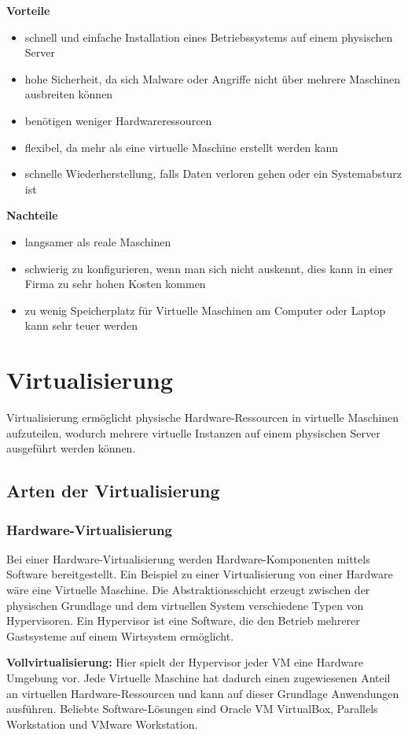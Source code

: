 \textbf{Vorteile}
\begin{itemize}
	\item schnell und einfache Installation eines Betriebssystems auf einem physischen Server
	\item hohe Sicherheit, da sich Malware oder Angriffe nicht über mehrere Maschinen ausbreiten können
	\item benötigen weniger Hardwareressourcen 
	\item flexibel, da mehr als eine virtuelle Maschine erstellt werden kann
	\item schnelle Wiederherstellung, falls Daten verloren gehen oder ein Systemabsturz ist
\end{itemize}

\textbf{Nachteile}
\begin{itemize}
	\item langsamer als reale Maschinen
	\item schwierig zu konfigurieren, wenn man sich nicht auskennt, dies kann in einer Firma zu sehr hohen Kosten kommen
	\item zu wenig Speicherplatz für Virtuelle Maschinen am Computer oder Laptop kann sehr teuer werden
\end{itemize}


\section{Virtualisierung}
Virtualisierung ermöglicht physische Hardware-Ressourcen in virtuelle Maschinen aufzuteilen, wodurch mehrere virtuelle Instanzen auf einem physischen Server ausgeführt werden können.

\subsection{Arten der Virtualisierung}
\subsubsection{Hardware-Virtualisierung}
Bei einer Hardware-Virtualisierung werden Hardware-Komponenten mittels Software bereitgestellt. Ein Beispiel zu einer Virtualisierung von einer Hardware wäre eine Virtuelle Maschine. Die Abstraktionsschicht erzeugt zwischen der physischen Grundlage und dem virtuellen System verschiedene Typen von Hypervisoren. Ein Hypervisor ist eine Software, die den Betrieb mehrerer Gastsysteme auf einem Wirtsystem ermöglicht.

\textbf{Vollvirtualisierung:} Hier spielt der Hypervisor jeder VM eine Hardware Umgebung vor. Jede Virtuelle Maschine hat dadurch einen zugewiesenen Anteil an virtuellen Hardware-Ressourcen und kann auf dieser Grundlage Anwendungen ausführen. Beliebte Software-Lösungen sind Oracle VM VirtualBox, Parallels Workstation und VMware Workstation.


